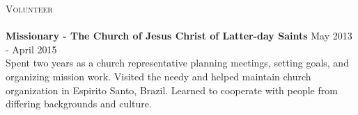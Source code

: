 \documentclass[a4paper]{article}
\newcommand{\lineunder} {
    \vspace*{-8pt} \\
    \hspace*{-18pt} \hrulefill \\
}
\newcommand{\header} [1] {
    {\hspace*{-18pt}\vspace*{6pt} \textsc{#1}}
    \vspace*{-6pt} \lineunder
}
\begin{document}
\header{Volunteer}
\textbf{Missionary - The Church of Jesus Christ of Latter-day Saints} \hfill May 2013 - April 2015\\
Spent two years as a church representative planning meetings, setting goals, and organizing mission work. Visited the needy and helped maintain church organization in Espirito Santo, Brazil. Learned to cooperate with people from differing backgrounds and culture.\\
\vspace*{2mm}

\ 
\end{document}
